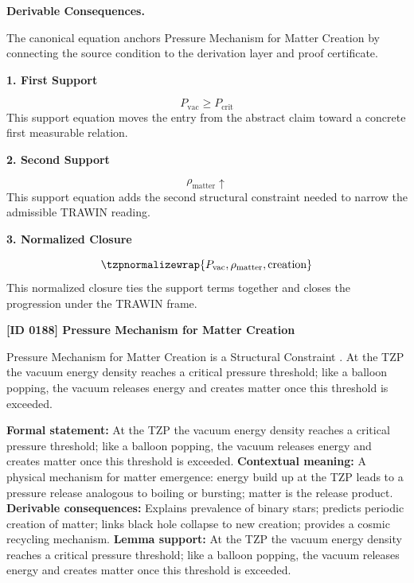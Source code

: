 \par\vspace{0.35em}
\noindent\textbf{Derivable Consequences.}\quad
\begingroup
\footnotesize
\raggedright
The canonical equation anchors Pressure Mechanism for Matter Creation by connecting the source condition to the derivation layer and proof certificate.
\par\endgroup

\noindent\textbf{1. First Support}\par
\[
P_{\mathrm{vac}} \ge P_{\mathrm{crit}}
\]
\noindent This support equation moves the entry from the abstract claim toward a concrete first measurable relation.\par
\noindent\textbf{2. Second Support}\par
\[
\rho_{\mathrm{matter}} \uparrow
\]
\noindent This support equation adds the second structural constraint needed to narrow the admissible TRAWIN reading.\par
\noindent\textbf{3. Normalized Closure}\par
\[
\tzpnormalizewrap{P_{\mathrm{vac}},\rho_{\mathrm{matter}},\text{creation}}
\]
\noindent This normalized closure ties the support terms together and closes the progression under the TRAWIN frame.\par

\clearpage
\noindent\textbf{[ID 0188] Pressure Mechanism for Matter Creation}\par
\vspace{0.35em}
\begingroup\small
{}
Pressure Mechanism for Matter Creation is a Structural Constraint  . At the TZP the vacuum energy density reaches a critical pressure threshold; like a balloon popping, the vacuum releases energy and creates matter once this threshold is exceeded.  

\begingroup\footnotesize\setlength{\emergencystretch}{3em}\sloppy
\textbf{Formal statement:} At the TZP the vacuum energy density reaches a critical pressure threshold; like a balloon popping, the vacuum releases energy and creates matter once this threshold is exceeded.  
\textbf{Contextual meaning:} A physical mechanism for matter emergence: energy build up at the TZP leads to a pressure release analogous to boiling or bursting; matter is the release product.  
\textbf{Derivable consequences:} Explains prevalence of binary stars; predicts periodic creation of matter; links black hole collapse to new creation; provides a cosmic recycling mechanism.
\textbf{Lemma support:} At the TZP the vacuum energy density reaches a critical pressure threshold; like a balloon popping, the vacuum releases energy and creates matter once this threshold is exceeded.  \par
\endgroup


